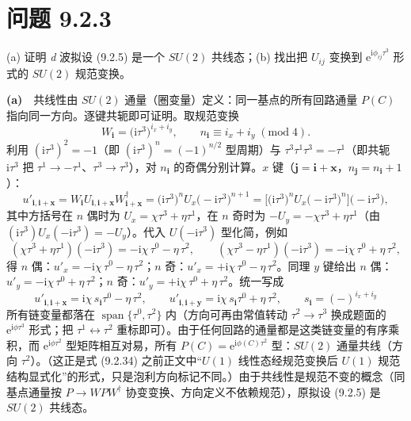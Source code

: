 \section*{问题 9.2.3}
\begin{problem}
(a) 证明 \emph{d} 波拟设 (9.2.5) 是一个 $SU(2)$ 共线态；(b) 找出把 $U_{ij}$ 变换到 $\mathrm{e}^{\mathrm{i}\phi_{ij}\tau^3}$ 形式的 $SU(2)$ 规范变换。
\end{problem}
\solution
\textbf{(a)}　共线性由 $SU(2)$ 通量（圈变量）定义：同一基点的所有回路通量 $P(C)$ 指向同一方向。逐键共轭即可证明。取规范变换
\begin{equation*}
W_{\pmb{i}}=\big(\mathrm{i}\tau^{3}\big)^{i_x+i_y},\qquad n_{\pmb{i}}\equiv i_x+i_y\;(\mathrm{mod}\;4) .
\end{equation*}
利用 $(\mathrm{i}\tau^3)^2=-1$（即 $(\mathrm{i}\tau^3)^n=(-1)^{n/2}$ 型周期）与 $\tau^3\tau^1\tau^3=-\tau^1$（即共轭 $\mathrm{i}\tau^3$ 把 $\tau^1\to-\tau^1$、$\tau^3\to\tau^3$），对 $n_{\pmb{i}}$ 的奇偶分别计算。$x$ 键（$\pmb{j}=\pmb{i}+\pmb{x}$，$n_{\pmb{j}}=n_{\pmb{i}}+1$）：
\begin{equation*}
u'_{\pmb{i},\pmb{i}+\pmb{x}}=W_{\pmb{i}}U_{\pmb{i},\pmb{i}+\pmb{x}}W^{\dagger}_{\pmb{i}+\pmb{x}}
=\big(\mathrm{i}\tau^3\big)^{n}U_x\big(-\mathrm{i}\tau^3\big)^{n+1}
=\big[\big(\mathrm{i}\tau^3\big)^{n}U_x\big(-\mathrm{i}\tau^3\big)^{n}\big]\big(-\mathrm{i}\tau^3\big) ,
\end{equation*}
其中方括号在 $n$ 偶时为 $U_x=\chi\tau^3+\eta\tau^1$，在 $n$ 奇时为 $-\!U_y=-\chi\tau^3+\eta\tau^1$（由 $(\mathrm{i}\tau^3)U_x(-\mathrm{i}\tau^3)=-U_y$）。代入 $U(−\mathrm{i}\tau^3)$ 型化简，例如
\begin{equation*}
(\chi\tau^3+\eta\tau^1)(-\mathrm{i}\tau^3)=-\mathrm{i}\chi\,\tau^0-\eta\,\tau^2,\qquad
(\chi\tau^3-\eta\tau^1)(-\mathrm{i}\tau^3)=-\mathrm{i}\chi\,\tau^0+\eta\,\tau^2 ,
\end{equation*}
得 $n$ 偶：$u'_x=-\mathrm{i}\chi\,\tau^0-\eta\,\tau^2$；$n$ 奇：$u'_x=+\mathrm{i}\chi\,\tau^0-\eta\,\tau^2$。同理 $y$ 键给出 $n$ 偶：$u'_y=-\mathrm{i}\chi\,\tau^0+\eta\,\tau^2$；$n$ 奇：$u'_y=+\mathrm{i}\chi\,\tau^0+\eta\,\tau^2$。统一写成
\begin{equation*}
\boxed{\;u'_{\pmb{i},\pmb{i}+\pmb{x}}=\mathrm{i}\chi\,s_{\pmb{i}}\tau^{0}-\eta\,\tau^{2},\qquad
u'_{\pmb{i},\pmb{i}+\pmb{y}}=\mathrm{i}\chi\,s_{\pmb{i}}\tau^{0}+\eta\,\tau^{2},\qquad
s_{\pmb{i}}=(-)^{i_x+i_y}\;}
\end{equation*}
所有链变量都落在 $\operatorname{span}\{\tau^0,\tau^2\}$ 内（方向可再由常值转动 $\tau^2\to\tau^3$ 换成题面的 $\mathrm{e}^{\mathrm{i}\phi\tau^3}$ 形式；把 $\tau^1\leftrightarrow\tau^2$ 重标即可）。由于任何回路的通量都是这类链变量的有序乘积，而 $\mathrm{e}^{\mathrm{i}\phi\tau^2}$ 型矩阵相互对易，所有 $P(C)=\mathrm{e}^{\mathrm{i}\phi(C)\tau^2}$ 型：$SU(2)$ 通量共线（方向 $\tau^2$）。（这正是式 (9.2.34) 之前正文中“$U(1)$ 线性态经规范变换后 $U(1)$ 规范结构显式化”的形式，只是泡利方向标记不同。）由于共线性是规范不变的概念（同基点通量按 $P\to WPW^{\dagger}$ 协变变换、方向定义不依赖规范），原拟设 (9.2.5) 是 $SU(2)$ 共线态。


